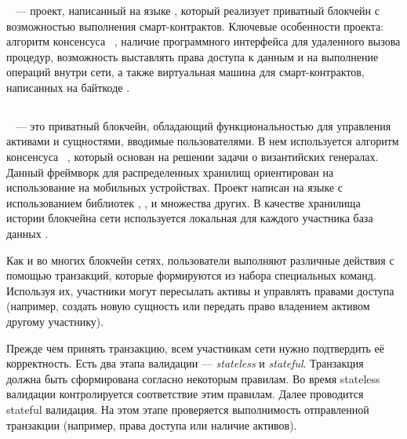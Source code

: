 \subsubsection{}
~\cite{HLBurrow} --- проект, написанный на языке , который реализует приватный блокчейн с возможностью выполнения смарт-контрактов.
Ключевые особенности проекта: алгоритм консенсуса ~\cite{Tendermint}, наличие программного интерфейса для удаленного вызова процедур, возможность выставлять права доступа к данным и на выполнение операций внутри сети, а также виртуальная машина для смарт-контрактов, написанных на байткоде .


\subsection{}
~\cite{iroha} --- это приватный блокчейн, обладающий функциональностью для управления активами и сущностями, вводимые пользователями.
В нем используется алгоритм консенсуса ~\cite{YAC}, который основан на решении задачи о византийских генералах.
Данный фреймворк для распределенных хранилищ ориентирован на использование на мобильных устройствах.
Проект написан на языке  с использованием библиотек , ,  и множества других.
В качестве хранилища истории блокчейна сети используется локальная для каждого участника база данных .

Как и во многих блокчейн сетях, пользователи  выполняют различные действия с помощью транзакций, которые формируются из набора специальных команд.
Используя их, участники могут пересылать активы и управлять правами доступа (например, создать новую сущность или передать право владением активом другому участнику).

Прежде чем принять транзакцию, всем участникам сети нужно подтвердить её корректность.
Есть два этапа валидации --- \emph{stateless} и \emph{sta\-te\-ful}.
Транзакция должна быть сформирована согласно некоторым правилам.
Во время stateless валидации контролируется соответствие этим правилам.
Далее проводится stateful валидация. 
На этом этапе проверяется выполнимость отправленной транзакции (например, права доступа или наличие активов).